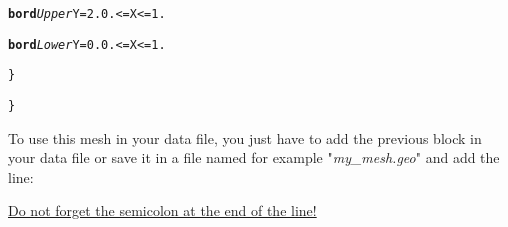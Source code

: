 \begin{center}
{\begin{minipage}[c]{0.9\textwidth}
\begin{alltt}
\hspace{2cm}            {\bf{bord}} \textit{Upper}   \hspace{0.25cm} Y = 2.  0. <= X <= 1.

\hspace{2cm}            {\bf{bord}} \textit{Lower}   \hspace{0.25cm} Y = 0.  0. <= X <= 1.

\hspace{1cm}        \}

\}
\end{alltt}
\end{minipage}}
\end{center}

To use this mesh in your data file, you just have to add the previous block in your data file or save it in a file named for example "\textit{my\_mesh.geo}" and add the line:\\
\begin{center}
\end{center}

\underline{Do not forget the semicolon at the end of the line!}\\




